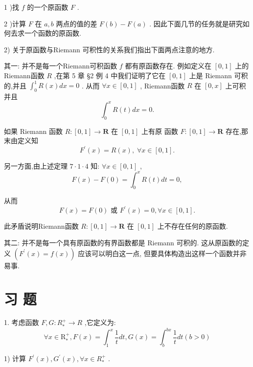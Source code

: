 1 )找 $f$ 的一个原函数 $F$ .

2 )计算 $F$ 在 $a,b$ 两点的值的差 $F\left( b\right)  - F\left( a\right)$ . 因此下面几节的任务就是研究如何去求一个函数的原函数.

2) 关于原函数与Riemann 可积性的关系我们指出下面两点注意的地方.

其一: 并不是每一个Riemann可积函数 $f$ 都有原函数存在. 例如定义在 $\left\lbrack  {0,1}\right\rbrack$ 上的Riemann函数 $R$ ,在第 5 章 §2 例 4 中我们证明了它在 $\left\lbrack  {0,1}\right\rbrack$ 上是 Riemann 可积的,并且 ${\int }_{0}^{1}R\left( x\right) {dx} = 0$ . 从而 $\forall x \in  \left\lbrack  {0,1}\right\rbrack$ , Riemann函数 $R$ 在 $\left\lbrack  {0,x}\right\rbrack$ 上可积并且
$${\int }_{0}^{x}R\left( t\right) {dx} = 0.$$

如果 Riemann 函数 $R : \left\lbrack  {0,1}\right\rbrack   \rightarrow  \mathbf{R}$ 在 $\left\lbrack  {0,1}\right\rbrack$ 上有原 函数 $F : \left\lbrack  {0,1}\right\rbrack   \rightarrow  \mathbf{R}$ 存在,那末由定义知
$${F}^{\prime }\left( x\right)  = R\left( x\right) ,\;\forall x \in  \left\lbrack  {0,1}\right\rbrack  .$$

另一方面,由上述定理 $7 \cdot  1 \cdot  4$ 知: $\forall x \in  \left\lbrack  {0,1}\right\rbrack$ ,
$$F\left( x\right)  - F\left( 0\right)  = {\int }_{0}^{x}R\left( t\right) {dt} = 0,$$

从而
$$F\left( x\right)  = F\left( 0\right) \text{ 或 }{F}^{\prime }\left( x\right)  = 0,\forall x \in  \left\lbrack  {0,1}\right\rbrack  .$$

此矛盾说明Riemann函数 $R : \left\lbrack  {0,1}\right\rbrack   \rightarrow  \mathbf{R}$ 在 $\left\lbrack  {0,1}\right\rbrack$ 上不存在任何的原函数.

其二: 并不是每一个具有原函数的有界函数都是 Riemann 可积的. 这从原函数的定义 $\left( {{F}^{\prime }\left( x\right)  = f\left( x\right) }\right)$ 应该可以明白这一点, 但要具体构造出这样一个函数并非易事.

\section*{习 题}

1. 考虑函数 $F,G : {R}_{ * }^{ + } \rightarrow  R$ ,它定义为:
$$\forall x \in  {\mathrm{R}}_{ * }^{ + },F\left( x\right)  = {\int }_{1}^{x}\frac{1}{t}{dt},G\left( x\right)  = {\int }_{b}^{bx}\frac{1}{t}{dt}\left( {b > 0}\right)$$

1) 计算 ${F}^{\prime }\left( x\right) ,{G}^{\prime }\left( x\right) ,\forall x \in  {R}_{ * }^{ + }$ .

